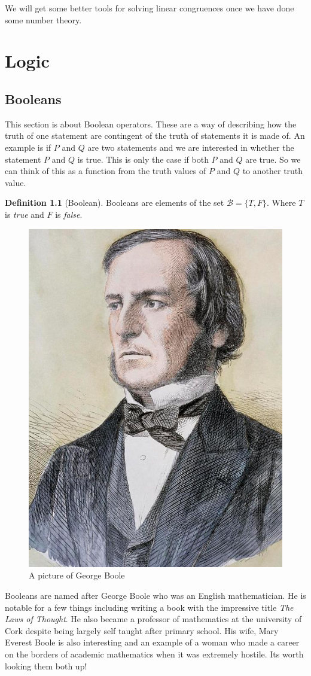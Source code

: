 \documentclass[
]{book}
\theoremstyle{definition}
\newtheorem{definition}{Definition}[chapter]
\theoremstyle{definition}
\theoremstyle{definition}
\theoremstyle{definition}
\theoremstyle{remark}
\begin{document}
We will get some better tools for solving linear congruences once we have done some number theory.

\chapter{Logic}\label{logic}

\section{Booleans}\label{booleans}

This section is about Boolean operators. These are a way of describing how the truth of one statement are contingent of the truth of statements it is made of. An example is if \(P\) and \(Q\) are two statements and we are interested in whether the statement \(P\) and \(Q\) is true. This is only the case if both \(P\) and \(Q\) are true. So we can think of this as a function from the truth values of \(P\) and \(Q\) to another truth value.

\begin{definition}[Boolean]
Booleans are elements of the set \(\mathcal{B}=\{T,F\}\). Where \(T\) is \emph{true} and \(F\) is \emph{false}.
\end{definition}

\begin{figure}
\includegraphics[width=0.3\linewidth]{George_Boole_color} \caption{A picture of George Boole}\label{fig:unnamed-chunk-26}
\end{figure}

Booleans are named after George Boole who was an English mathematician. He is notable for a few things including writing a book with the impressive title \emph{The Laws of Thought}. He also became a professor of mathematics at the university of Cork despite being largely self taught after primary school. His wife, Mary Everest Boole is also interesting and an example of a woman who made a career on the borders of academic mathematics when it was extremely hostile. Its worth looking them both up!
\end{document}
